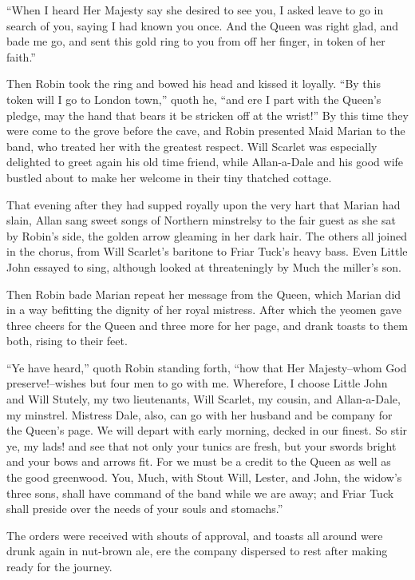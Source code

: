 ``When I heard Her Majesty say she desired to see you, I asked leave to
go in search of you, saying I had known you once. And the Queen was
right glad, and bade me go, and sent this gold ring to you from off her
finger, in token of her faith.''

Then Robin took the ring and bowed his head and kissed it loyally. ``By
this token will I go to London town,'' quoth he, ``and ere I part with
the Queen's pledge, may the hand that bears it be stricken off at the
wrist!'' By this time they were come to the grove before the cave, and
Robin presented Maid Marian to the band, who treated her with the
greatest respect. Will Scarlet was especially delighted to greet again
his old time friend, while Allan-a-Dale and his good wife bustled about
to make her welcome in their tiny thatched cottage.

That evening after they had supped royally upon the very hart that
Marian had slain, Allan sang sweet songs of Northern minstrelsy to the
fair guest as she sat by Robin's side, the golden arrow gleaming in her
dark hair. The others all joined in the chorus, from Will Scarlet's
baritone to Friar Tuck's heavy bass. Even Little John essayed to sing,
although looked at threateningly by Much the miller's son.

Then Robin bade Marian repeat her message from the Queen, which Marian
did in a way befitting the dignity of her royal mistress. After which
the yeomen gave three cheers for the Queen and three more for her page,
and drank toasts to them both, rising to their feet.

``Ye have heard,'' quoth Robin standing forth, ``how that Her
Majesty--whom God preserve!--wishes but four men to go with me.
Wherefore, I choose Little John and Will Stutely, my two lieutenants,
Will Scarlet, my cousin, and Allan-a-Dale, my minstrel. Mistress Dale,
also, can go with her husband and be company for the Queen's page. We
will depart with early morning, decked in our finest. So stir ye, my
lads! and see that not only your tunics are fresh, but your swords
bright and your bows and arrows fit. For we must be a credit to the
Queen as well as the good greenwood. You, Much, with Stout Will, Lester,
and John, the widow's three sons, shall have command of the band while
we are away; and Friar Tuck shall preside over the needs of your souls
and stomachs.''

The orders were received with shouts of approval, and toasts all around
were drunk again in nut-brown ale, ere the company dispersed to rest
after making ready for the journey.

